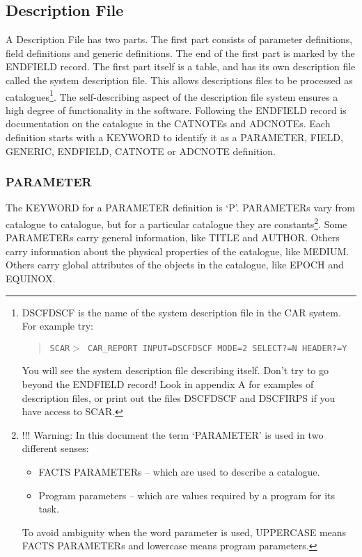 \subsection {Description File}
A Description File has two parts.
The first part consists of parameter definitions, field definitions and generic
definitions.
The end of the first part is marked by the ENDFIELD record.
The first part itself is a table, and has its own description file called the
system description file.
This allows descriptions files to be processed as catalogues\footnote
{DSCFDSCF is the name of the system description file in the CAR system.
For example try:
\begin{quote}
   {\tt SCAR$>$ CAR\_REPORT INPUT=DSCFDSCF MODE=2 SELECT?=N HEADER?=Y}
\end{quote}
You will see the system description file describing itself.
Don't try to go beyond the ENDFIELD record!
Look in appendix A for examples of description files, or print out
the files DSCFDSCF and DSCFIRPS if you have access to SCAR.}.
The self-describing aspect of the description file system ensures a high degree
of functionality in the software.
Following the ENDFIELD record is documentation on the catalogue in the
CATNOTEs and ADCNOTEs.
Each definition starts with a KEYWORD to identify it as a PARAMETER,
FIELD, GENERIC, ENDFIELD, CATNOTE or ADCNOTE definition.
\subsubsection {PARAMETER}
The KEYWORD for a PARAMETER definition is `P'.
PARAMETERs vary from catalogue to catalogue, but for a particular catalogue they
are constants\footnote
{!!! Warning:
In this document the term `PARAMETER' is used in two different senses:
\begin{itemize}
\item FACTS PARAMETERs -- which are used to describe a catalogue.
\item Program parameters -- which are values required by a program for its task.
\end{itemize}
To avoid ambiguity when the word parameter is used, UPPERCASE means FACTS
PARAMETERs and lowercase means program parameters.}.
Some PARAMETERs carry general information, like TITLE and AUTHOR.
Others carry information about the physical properties of the catalogue, like
MEDIUM.
Others carry global attributes of the objects in the catalogue, like EPOCH and
EQUINOX.

